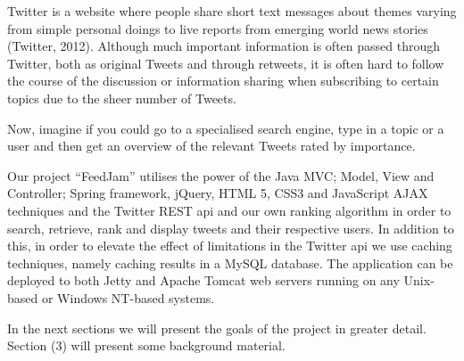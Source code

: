 Twitter is a website where people share short text messages about themes varying from simple personal doings to live reports from emerging world news stories (Twitter, 2012). Although much important information is often passed through Twitter, both as original Tweets and through retweets, it is often hard to follow the course of the discussion or information sharing when subscribing to certain topics due to the sheer number of Tweets.

Now, imagine if you could go to a specialised search engine, type in a topic or a user and then get an overview of the relevant Tweets rated by importance.

Our project “FeedJam” utilises the power of the Java MVC; Model, View and Controller; Spring framework, jQuery, HTML 5, CSS3 and JavaScript AJAX techniques and the Twitter REST api and our own ranking algorithm in order to search, retrieve, rank and display tweets and their respective users. In addition to this, in order to elevate the effect of limitations in the Twitter api we use caching techniques, namely caching results in a MySQL database. The application can be deployed to both Jetty and Apache Tomcat web servers running on any Unix-based or Windows NT-based systems.

In the next sections we will present the goals of the project in greater detail. Section (3) will present some background material.